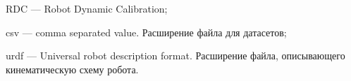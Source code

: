 \newpage
\begin{abbreviations}



RDC --- Robot Dynamic Calibration;

csv --- comma separated value. Расширение файла для датасетов;

urdf --- Universal robot description format. Расширение файла, описывающего кинематическую схему робота.

\end{abbreviations}